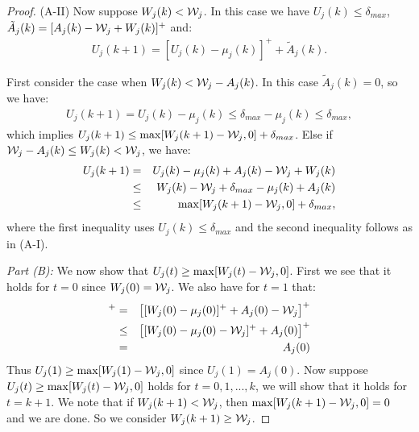 \documentclass[journal]{IEEEtran}
\newcommand{\script}[1]{{{\cal{#1} }}}
\begin{document}
\begin{proof}

(A-II) Now suppose $W_j(k)<\script{W}_j$. In this case we have $U_j(k)\leq \delta_{max}$, $\tilde{A}_j(k)=[A_j(k)-\script{W}_j+W_j(k)]^+$ and:
\begin{eqnarray*}
U_j(k+1)=[U_j(k)-\mu_j(k)]^++\tilde{A}_j(k).
\end{eqnarray*}

First consider the case when $W_j(k)<\script{W}_j-A_j(k)$. In this case $\tilde{A}_j(k)=0$, so we have: 
\begin{eqnarray*}
U_j(k+1)=U_j(k)-\mu_j(k)\leq\delta_{max}-\mu_j(k)\leq\delta_{max},
\end{eqnarray*}
which implies $U_j(k+1)\leq\max[W_j(k+1)-\script{W}_j, 0]+\delta_{max}$. Else if $\script{W}_j-A_j(k)\leq W_j(k)< \script{W}_j$, we have:
\begin{eqnarray*}
U_j(k+1)&=&U_j(k)-\mu_j(k)+A_j(k)-\script{W}_j+W_j(k)\\
&\leq& W_j(k)-\script{W}_j+\delta_{max}-\mu_j(k)+A_j(k)\\
&\leq&\max[W_j(k+1)-\script{W}_j, 0]+\delta_{max},
\end{eqnarray*}
where the first inequality uses $U_j(k)\leq\delta_{max}$ and the second inequality follows as in (A-I). 


\emph{Part (B):} We now show that $U_j(t)\geq\max[W_j(t)-\script{W}_j, 0]$. First we see that it holds for $t=0$ since $W_j(0)=\script{W}_j$. We also have for $t=1$ that:
\begin{eqnarray*}
[W_j(1)-\script{W}_j]^+&=&\big[[W_j(0)-\mu_j(0)]^++A_j(0)-\script{W}_j\big]^+\\
&\leq& \big[[W_j(0)-\mu_j(0)-\script{W}_j]^++A_j(0)\big]^+\\
&=& A_j(0)
\end{eqnarray*}
Thus $U_j(1)\geq\max[W_j(1)-\script{W}_j, 0]$ since $U_j(1)=A_j(0)$. Now suppose $U_j(t)\geq\max[W_j(t)-\script{W}_j, 0]$ holds for $t=0,1,...,k$, we will show that it holds for $t=k+1$. We note that if $W_j(k+1)<\script{W}_j$, then $\max[W_j(k+1)-\script{W}_j, 0]=0$ and we are done. So we consider $W_j(k+1)\geq\script{W}_j$.



\end{proof}
\end{document}
